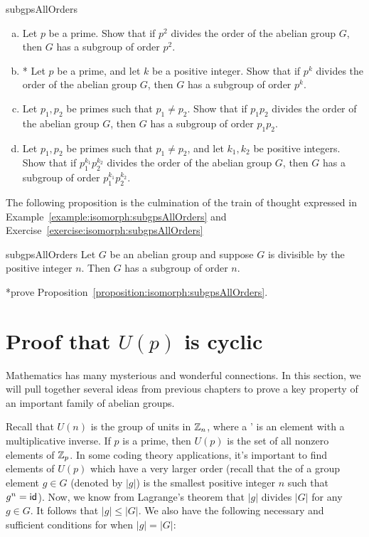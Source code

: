 \begin{exercise}{subgpsAllOrders}
\begin{enumerate}[(a)]
\item
Let $p$ be a prime. Show that if $p^2$ divides the order of the abelian group $G$, then $G$ has a subgroup of order $p^2$.
\item
* Let $p$ be a prime, and let $k$ be a positive integer. Show that if $p^k$ divides the order of the abelian group $G$, then $G$ has a subgroup of order $p^k$.
\item
Let $p_1, p_2$ be primes such that $p_1 \neq p_2$.  Show that if $p_1p_2$ divides the order of the abelian group $G$, then $G$ has a subgroup of order $p_1p_2$.
\item
Let $p_1, p_2$ be primes such that $p_1 \neq p_2$, and let $k_1,k_2$ be positive integers.  Show that if $p_1^{k_1}p_2^{k_2}$ divides the order of the abelian group $G$, then $G$ has a subgroup of order $p_1^{k_1}p_2^{k_2}$.
\end{enumerate}
\end{exercise}

The following proposition is the culmination of the train of thought expressed in Example~\ref{example:isomorph:subgpsAllOrders} and Exercise~\ref{exercise:isomorph:subgpsAllOrders}

\begin{prop}{subgpsAllOrders} Let $G$ be an abelian group and suppose $G$ is divisible by the positive integer $n$.  Then $G$ has a subgroup of order $n$.
\end{prop}

\begin{exercise} *prove Proposition~\ref{proposition:isomorph:subgpsAllOrders}.
\end{exercise} 


 
\section{Proof that $U(p)$ is cyclic}
\label{sec:UpIsCyclic}

Mathematics has many mysterious and wonderful connections. In this section, we will pull together several ideas from previous chapters to prove a key property of an important family of abelian groups.
 
Recall that $U(n)$ is the group of units in $\mathbb{Z}_n$, where a ' is an element with a multiplicative inverse. If $p$ is a prime, then $U(p)$ is the set of all nonzero elements of $\mathbb{Z}_p$. In some coding theory applications, it's important to find elements of $U(p)$ which have a very larger order (recall that the  of a group element $g \in G$ (denoted by $|g|$)  is the smallest positive integer $n$ such that $g^n = {\sf{i}d}$). Now, we know from Lagrange's theorem that $|g|$ divides $|G|$ for any $g \in G$.  It follows that $|g| \le |G|$. We also have the following necessary and sufficient conditions for when $|g|=|G|$:

